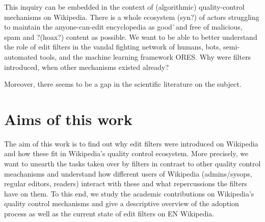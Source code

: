 This inquiry can be embedded in the context of (algorithmic) quality-control mechanisms on Wikipedia.
There is a whole ecosystem (syn?) of actors struggling to maintain the anyone-can-edit encyclopedia as good^^ and free of malicious, spam and ?(hoax?) content as possible.
We want to be able to better understand the role of edit filters in the vandal fighting network of humans, bots, semi-automated tools, and the machine learning framework ORES.
Why were filters introduced, when other mechanisms existed already?

Moreover, there seems to be a gap in the scientific literature on the subject.

\begin{comment}
\section{Algorithmic Governance}

should be mentioned here;
it's important for framing along with Lessig's "Code is law".

algorithmic governance?/socio-technical assemblage
* humans
* software
* tech. infrastructure

\cite{GeiHal2017}

Claudia's paper:
"“In both cases of algorithmic governance
– software features and bots – making rules part of the infrastructure, to a certain extent, makes
them harder to change and easier to enforce” (p. 87)"

\end{comment}
\section{Aims of this work}

The aim of this work is to find out why edit filters were introduced on Wikipedia and how these fit in Wikipedia's quality control ecosystem.
More precisely, we want to unearth the tasks taken over by filters in contrast to other quality control meachanisms
and understand how different users of Wikipedia (admins/sysops, regular editors, readers) interact with these and what repercussions the filters have on them.
To this end, we study the academic contributions on Wikipedia's quality control mechanisms and give a descriptive overview of the adoption process as well as the current state of edit filters on EN Wikipedia.

